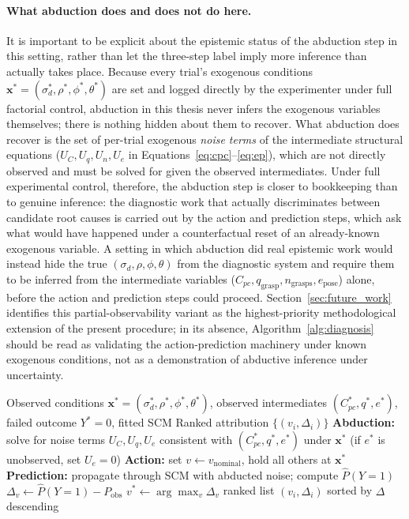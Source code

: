 \documentclass[11pt,a4paper]{report}
\begin{document}
\paragraph{What abduction does and does not do here.} It is important to be explicit about the epistemic status of the abduction step in this setting, rather than let the three-step label imply more inference than actually takes place. Because every trial's exogenous conditions $\mathbf{x}^* = (\sigma_d^*, \rho^*, \phi^*, \theta^*)$ are set and logged directly by the experimenter under full factorial control, abduction in this thesis never infers the exogenous variables themselves; there is nothing hidden about them to recover. What abduction does recover is the set of per-trial exogenous \emph{noise terms} of the intermediate structural equations ($U_C, U_q, U_n, U_e$ in Equations~\eqref{eq:cpc}--\eqref{eq:ep}), which are not directly observed and must be solved for given the observed intermediates. Under full experimental control, therefore, the abduction step is closer to bookkeeping than to genuine inference: the diagnostic work that actually discriminates between candidate root causes is carried out by the action and prediction steps, which ask what would have happened under a counterfactual reset of an already-known exogenous variable. A setting in which abduction did real epistemic work would instead hide the true $(\sigma_d, \rho, \phi, \theta)$ from the diagnostic system and require them to be inferred from the intermediate variables ($C_{pc}, q_{\text{grasp}}, n_{\text{grasps}}, e_{\text{pose}}$) alone, before the action and prediction steps could proceed. Section~\ref{sec:future_work} identifies this partial-observability variant as the highest-priority methodological extension of the present procedure; in its absence, Algorithm~\ref{alg:diagnosis} should be read as validating the action-prediction machinery under known exogenous conditions, not as a demonstration of abductive inference under uncertainty.

\begin{algorithm}[t]
\caption{SCM Counterfactual Failure Diagnosis}
\label{alg:diagnosis}
\begin{algorithmic}[1]
\Require Observed conditions $\mathbf{x}^* = (\sigma_d^*, \rho^*, \phi^*, \theta^*)$, observed intermediates $(C_{pc}^*, q^*, e^*)$, failed outcome $Y^* = 0$, fitted SCM
\Ensure Ranked attribution $\{(v_i, \Delta_i)\}$
\State \textbf{Abduction:} solve for noise terms $U_C, U_q, U_e$ consistent with $(C_{pc}^*, q^*, e^*)$ under $\mathbf{x}^*$ (if $e^*$ is unobserved, set $U_e{=}0$)
  \State \textbf{Action:} set $v \leftarrow v_{\text{nominal}}$, hold all others at $\mathbf{x}^*$
  \State \textbf{Prediction:} propagate through SCM with abducted noise; compute $\hat{P}(Y{=}1)$
  \State $\Delta_v \leftarrow \hat{P}(Y{=}1) - P_{\text{obs}}$
\EndFor
\State $v^* \leftarrow \arg\max_v \Delta_v$
\State \Return ranked list $(v_i, \Delta_i)$ sorted by $\Delta$ descending
\end{algorithmic}
\end{algorithm}
\end{document}
